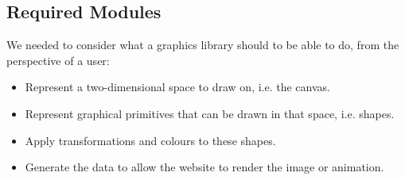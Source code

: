 \documentclass[../main.tex]{subfiles}
\begin{document}
        \subsection{Required Modules}
            We needed to consider what a graphics library should to be able to do, from the
            perspective of a user:
            \begin{itemize}
                \item Represent a two-dimensional space to draw on, i.e. the canvas.
                \item Represent graphical primitives that can be drawn in that space, i.e.
                      shapes.
                \item Apply transformations and colours to these shapes.
                \item Generate the data to allow the website to render the image or animation.
            \end{itemize}
\end{document}

